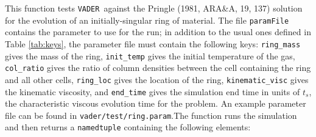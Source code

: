 \documentclass[12pt]{article}
\newcommand{\vader}{\texttt{VADER}}
\begin{document}
This function tests \vader\ against the Pringle (1981, ARA\&A, 19, 137) solution for the evolution of an initially-singular ring of material. The file \texttt{paramFile} contains the parameter to use for the run; in addition to the usual ones defined in Table \ref{tab:keys}, the parameter file must contain the following keys: \verb=ring_mass= gives the mass of the ring, \verb=init_temp= gives the initial temperature of the gas, \verb=col_ratio= gives the ratio of column densities between the cell containing the ring and all other cells, \verb=ring_loc= gives the location of the ring, \verb=kinematic_visc= gives the kinematic viscosity, and \verb=end_time= gives the simulation end time in units of $t_s$, the characteristic viscous evolution time for the problem. An example parameter file can be found in \verb=vader/test/ring.param=.The function runs the simulation and then returns a \verb=namedtuple= containing the following elements:
\end{document}
